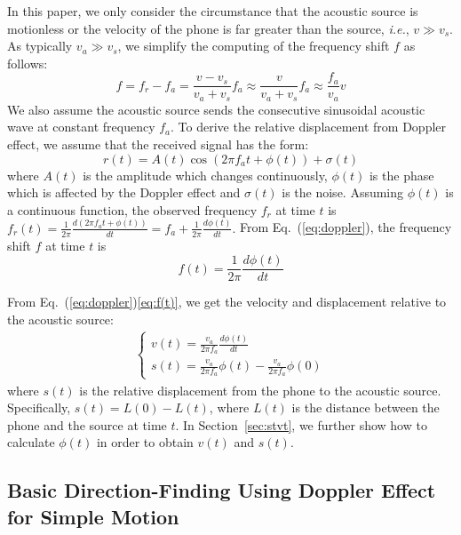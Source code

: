 \documentclass[]{sig-alternate-10pt}
\def\ie{\textit{i.e.}\xspace}
\newcommand{\eqqref}[1]{Eq.~(\ref{#1})}
\begin{document}
In this paper, we only consider the circumstance that the acoustic
source is motionless or the velocity of the phone is far greater than
the source, \ie, $v\gg v_s$.
As typically $v_a\gg v_s$,
we simplify the computing of the frequency shift $f$ as follows:
\begin{equation}
    f=f_r-f_a=\frac{v-v_{s}}{v_{a}+v_{s}}f_{a}\approx
    \frac{v}{v_{a}+v_{s}}f_{a} \approx
    \frac{f_a}{v_a}v\label{eq:doppler}
\end{equation}
We also assume the acoustic source sends the consecutive sinusoidal
acoustic wave at constant frequency $f_a$.
To  derive the relative displacement from Doppler effect, we  assume
that the received signal has the form:
\begin{equation}
    r(t)=A(t)\cos(2\pi f_{a}t+\phi(t))+\sigma(t)
\label{eq:received-signal}
\end{equation}
where $A(t)$ is the amplitude which changes continuously,
$\phi(t)$ is the phase which is affected by the Doppler effect and
$\sigma(t)$ is the noise. Assuming $\phi(t)$ is a continuous function,
the observed frequency $f_r$ at  time $t$ is
$    f_r(t)=\frac{1}{2\pi}\frac{d( 2\pi f_{a}t+\phi(t))}{dt}=
    f_a+\frac{1}{2\pi}\frac{d\phi(t)}{dt}.$
From \eqqref{eq:doppler}, the frequency shift $f$ at  time $t$ is
\begin{equation}
    f(t)=\frac{1}{2\pi}\frac{d\phi(t)}{dt}
    \label{eq:f(t)}
\end{equation}

From \eqqref{eq:doppler}\eqref{eq:f(t)},
we get the velocity and displacement relative to the acoustic source:
\begin{eqnarray}
    \begin{cases}
        v(t)=\frac{v_{a}}{2\pi f_{a}}\frac{d\phi(t)}{dt} \\
        s(t)=\frac{v_{a}}{2\pi f_{a}}\phi(t)-\frac{v_{a}}{2\pi f_{a}}\phi(0)
    \end{cases}
    \label{eq:v-and-phi}
    \label{eq:s-and-phi}
\end{eqnarray}
where $s(t)$ is the relative displacement from the phone to the acoustic source. Specifically, $s(t)=L(0)-L(t)$, where $L(t)$ is the distance between the phone and the source at
time $t$.
In Section~\ref{sec:stvt}, we further show how to calculate $\phi(t)$
in order to obtain $v(t)$ and $s(t)$.

\subsection{Basic Direction-Finding Using Doppler Effect for Simple Motion}
\end{document}
